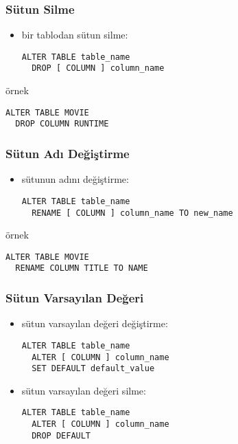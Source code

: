 \documentclass[dvipsnames]{beamer}
\theoremstyle{plain}
\begin{document}
\begin{frame}[fragile]
  \frametitle{Sütun Silme}

  \begin{itemize}
    \item bir tablodan sütun silme:
    \begin{lstlisting}
ALTER TABLE table_name
  DROP [ COLUMN ] column_name
    \end{lstlisting}
  \end{itemize}

  \medskip
  \begin{exampleblock}{örnek}
    \begin{lstlisting}
ALTER TABLE MOVIE
  DROP COLUMN RUNTIME
    \end{lstlisting}
  \end{exampleblock}
\end{frame}

\begin{frame}[fragile]
  \frametitle{Sütun Adı Değiştirme}

  \begin{itemize}
    \item sütunun adını değiştirme:
    \begin{lstlisting}
ALTER TABLE table_name
  RENAME [ COLUMN ] column_name TO new_name
    \end{lstlisting}
  \end{itemize}

  \medskip
  \begin{exampleblock}{örnek}
    \begin{lstlisting}
ALTER TABLE MOVIE
  RENAME COLUMN TITLE TO NAME
    \end{lstlisting}
  \end{exampleblock}
\end{frame}

\begin{frame}[fragile]
  \frametitle{Sütun Varsayılan Değeri}

  \begin{itemize}
    \item sütun varsayılan değeri değiştirme:
    \begin{lstlisting}
ALTER TABLE table_name
  ALTER [ COLUMN ] column_name
  SET DEFAULT default_value
    \end{lstlisting}

    \item sütun varsayılan değeri silme:
    \begin{lstlisting}
ALTER TABLE table_name
  ALTER [ COLUMN ] column_name
  DROP DEFAULT
    \end{lstlisting}
  \end{itemize}  
\end{frame}
\end{document}
